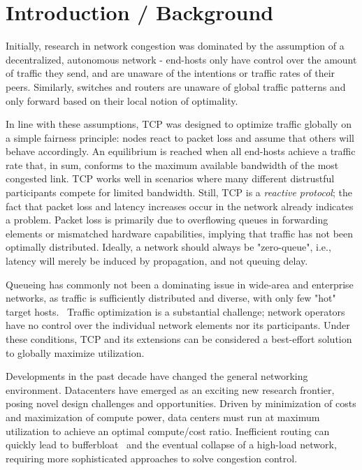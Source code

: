\documentclass[sigconf]{acmart}
\begin{document}
\maketitle

%
%
%
%
%
%
%

\section{Introduction / Background}
\label{sec:intro}

Initially, research in network congestion was dominated by the assumption of a decentralized, autonomous network - end-hosts only have control over the amount of traffic they send, and are unaware of the intentions or traffic rates of their peers. Similarly, switches and routers are unaware of global traffic patterns and only forward based on their local notion of optimality.

In line with these assumptions, TCP was designed to optimize traffic globally on a simple fairness principle: nodes react to packet loss and assume that others will behave accordingly. An equilibrium is reached when all end-hosts achieve a traffic rate that, in sum, conforms to the maximum available bandwidth of the most congested link.
TCP works well  in scenarios where many different distrustful participants compete for limited bandwidth. Still, TCP is a \textit{reactive protocol}; the fact that packet loss and latency increases occur in the network already indicates a problem. Packet loss is primarily due to overflowing queues in forwarding elements or mismatched hardware capabilities, implying that traffic has not been optimally distributed. Ideally, a network should always be "zero-queue", i.e., latency will merely be induced by propagation, and not queuing delay.

Queueing has commonly not been a dominating issue in wide-area and enterprise networks, as traffic is sufficiently distributed and diverse, with only few "hot" target hosts.~\cite{hedera, microte} Traffic optimization is a substantial challenge; network operators have no control over the individual network elements nor its participants. Under these conditions, TCP and its extensions can be considered a best-effort solution to globally maximize utilization.

Developments in the past decade have changed the general networking environment. Datacenters have emerged as an exciting new research frontier, posing novel design challenges and opportunities. Driven by minimization of costs and maximization of compute power, data centers must  run at maximum utilization to achieve an optimal compute/cost ratio. Inefficient routing can quickly lead to bufferbloat~\cite{bufferbloat} and the eventual collapse of a high-load network, requiring more sophisticated approaches to solve congestion control.
\end{document}
